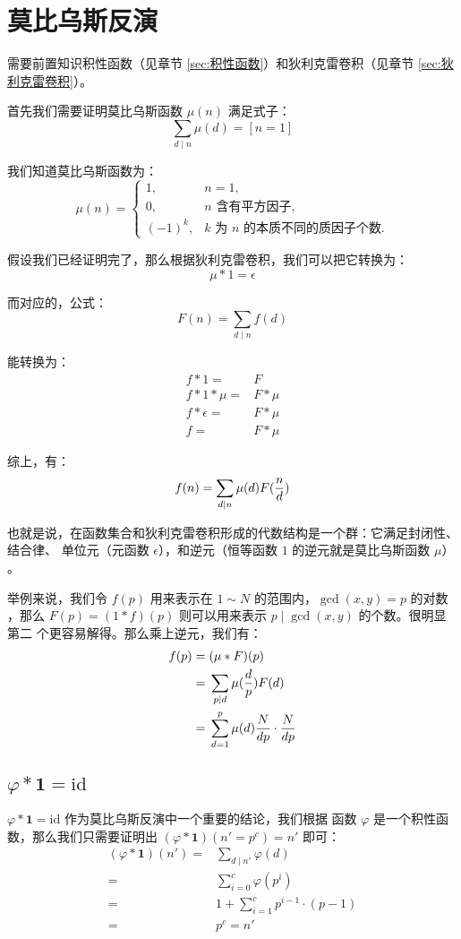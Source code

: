 \section{莫比乌斯反演}
需要前置知识积性函数（见章节 \ref{sec:积性函数}）和狄利克雷卷积（见章节
\ref{sec:狄利克雷卷积}）。

首先我们需要证明莫比乌斯函数 $\mu(n)$ 满足式子：\[
    \sum_{d \mid n} \mu(d) = [n = 1]
\]

我们知道莫比乌斯函数为：\[
    \mu(n) = \begin{cases}
        1,      & n = 1, \\
        0,      & n \text{ 含有平方因子}, \\
        (-1)^k, & k \text{ 为 } n \text{ 的本质不同的质因子个数}.
    \end{cases}
\]

假设我们已经证明完了，那么根据狄利克雷卷积，我们可以把它转换为：\[
    \mu * 1 = \epsilon
\]

而对应的，公式：\[
    F(n) = \sum_{d \mid n} f(d)
\]

能转换为：\begin{align*}
    f * 1        = {} & F \\
    f * 1 * \mu  = {} & F * \mu \\
    f * \epsilon = {} & F * \mu \\
    f            = {} & F * \mu
\end{align*}

综上，有：\[
    f(n) = \sum_{d \mid n} \mu(d) F({n \over d})
\]

也就是说，在函数集合和狄利克雷卷积形成的代数结构是一个群：它满足封闭性、结合律、
单位元（元函数 $\epsilon$），和逆元（恒等函数 $1$ 的逆元就是莫比乌斯函数 $\mu$）
。

举例来说，我们令 $f(p)$ 用来表示在 $1 \sim N$ 的范围内，$\gcd(x, y) = p$ 的对数
，那么 $F(p) = (1 * f)(p)$ 则可以用来表示 $p \mid \gcd(x, y)$ 的个数。很明显第二
个更容易解得。那么乘上逆元，我们有：\begin{align*}
    f(p) = {} & (\mu * F)(p) \\
         = {} & \sum_{p \mid d} \mu({d \over p}) F(d) \\
         = {} & \sum_{d = 1}^{p} \mu(d){N \over dp}\cdot{N \over dp}
\end{align*}

\subsection{$\varphi * \mathbf{1} = \mathrm{id}$}
$\varphi * \mathbf{1} = \mathrm{id}$ 作为莫比乌斯反演中一个重要的结论，我们根据
函数 $\varphi$ 是一个积性函数，那么我们只需要证明出 $(\varphi * \mathbf{1})(n' =
p^c) = n'$ 即可：\begin{align*}
    (\varphi * \mathbf{1})(n') = {} & \sum_{d \mid n'} \varphi(d) \\
                               = {} & \sum_{i = 0}^{c} \varphi(p^i) \\
                               = {} & 1 + \sum_{i = 1}^{c} p^{i - 1} \cdot (p - 1) \\
                               = {} & p^c = n'
\end{align*}

